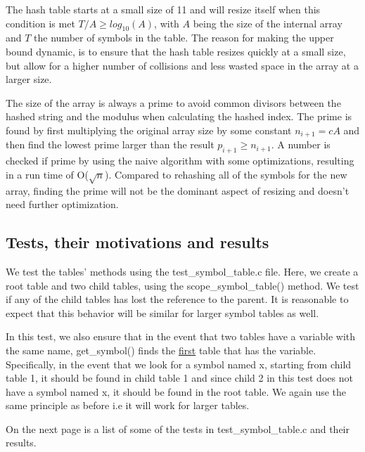 \documentclass{article}
\begin{document}
The hash table starts at a small size of 11 and will resize itself when this condition is met $T / A \geq log_{10}(A)$, with $A$ being the size of the internal array and $T$ the number of symbols in the table. The reason for making the upper bound dynamic, is to ensure that the hash table resizes quickly at a small size, but allow for a higher number of collisions and less wasted space in the array at a larger size. 

The size of the array is always a prime to avoid common divisors between the hashed string and the modulus when calculating the hashed index. The prime is found by first multiplying the original array size by some constant $n_{i+1} = cA$ and then find the lowest prime larger than the result $p_{i+1} \geq n_{i+1}$. A number is checked if prime by using the naive algorithm with some optimizations, resulting in a run time of O($\sqrt{n}$). Compared to rehashing all of the symbols for the new array, finding the prime will not be the dominant aspect of resizing and doesn't need further optimization.



\subsection{Tests, their motivations and results}
We test the tables' methods using the test\_symbol\_table.c file. Here, we create a root table and two child tables, using the  scope\_symbol\_table() method. We test if any of the child tables has lost the reference to the parent. It is reasonable to expect that this behavior will be similar for larger symbol tables as well.

In this test, we also ensure that in the event that two tables have a variable with the same name, get\_symbol() finds the \underline{first} table that has the variable. Specifically, in the event that we look for a symbol named x, starting from child table 1, it should be found in child table 1 and since child 2 in this test does not have a symbol named x, it should be found in the root table. We again use the same principle as before i.e it will work for larger tables.

On the next page is a list of some of the tests in test\_symbol\_table.c and their results.
\end{document}
